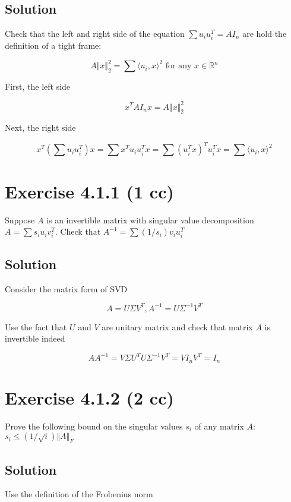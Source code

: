 \documentclass{article}
\begin{document}
\subsection{Solution}

Check that the left and right side of the equation $\sum u_iu_i^T = AI_n$ are hold the definition of a tight frame:

$$A\Vert x \Vert_2^2 = \sum \langle u_i, x \rangle^2 \text{ for any $x \in \mathbb R^n$}$$

First, the left side

$$x^TAI_nx = A\Vert x \Vert_2^2$$

Next, the right side

$$x^T\left(\sum u_iu_i^T\right)x = \sum x^Tu_iu_i^Tx = \sum \left(u_i^Tx\right)^Tu_i^Tx = \sum \langle u_i, x \rangle^2$$

\section{Exercise 4.1.1 (1 cc)}

Suppose $A$ is an invertible matrix with singular value decomposition $A = \sum s_i u_i v_i^T$. Check that $A^{-1} = \sum (1/s_i)v_iu_i^T$

\subsection{Solution}

Consider the matrix form of SVD

$$A = U \Sigma V^T, A^{-1} = U \Sigma^{-1} V^T$$

Use the fact that $U$ and $V$ are unitary matrix and check that matrix $A$ is invertible indeed

$$AA^{-1} = V\Sigma U^TU \Sigma^{-1}V^T = V I_n V^T = I_n$$

\section{Exercise 4.1.2 (2 cc)}

Prove the following bound on the singular values $s_i$ of any matrix $A$: $s_i \leq (1/\sqrt{i}) \Vert A \Vert_F$

\subsection{Solution}

Use the definition of the Frobenius norm
\end{document}
